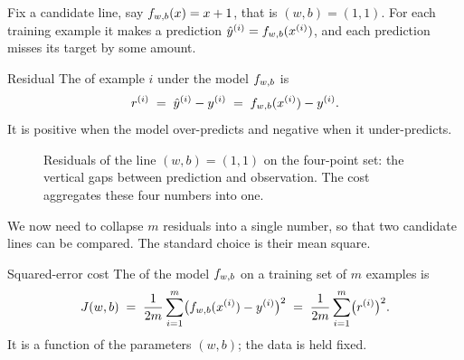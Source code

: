 Fix a candidate line, say $f_{w,b}(x) = x + 1$, that is $(w,b) = (1,1)$. For each
training example it makes a prediction $\hat{y}^{(i)} = f_{w,b}(x^{(i)})$, and each
prediction misses its target by some amount.

\begin{defbox}{Residual}
The  of example $i$ under the model $f_{w,b}$ is
\[
  r^{(i)} \;=\; \hat{y}^{(i)} - y^{(i)} \;=\; f_{w,b}(x^{(i)}) - y^{(i)} .
\]
It is positive when the model over-predicts and negative when it
under-predicts.
\end{defbox}

\begin{figure}[htbp]
  \centering
  \caption{Residuals of the line $(w,b)=(1,1)$ on the four-point set: the
  vertical gaps between prediction and observation. The cost aggregates these
  four numbers into one.}
  \label{fig:residuals}
\end{figure}

We now need to collapse $m$ residuals into a single number, so that two
candidate lines can be compared. The standard choice is their mean square.

\begin{defbox}{Squared-error cost}
The  of the model $f_{w,b}$ on a training set of $m$
examples is
\[
  J(w,b) \;=\; \frac{1}{2m}\sum_{i=1}^{m}
              \bigl(f_{w,b}(x^{(i)}) - y^{(i)}\bigr)^{2}
        \;=\; \frac{1}{2m}\sum_{i=1}^{m}\bigl(r^{(i)}\bigr)^{2} .
\]
It is a function of the parameters $(w,b)$; the data is held fixed.
\end{defbox}

